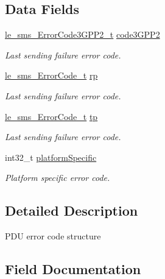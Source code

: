\subsection*{Data Fields}
\begin{DoxyCompactItemize}
\item 
\hyperlink{le__sms__interface_8h_aeb77e45e90a8257c2b386428fa9397df}{le\+\_\+sms\+\_\+\+Error\+Code3\+G\+P\+P2\+\_\+t} \hyperlink{structpa__sms___sending_err_code__t_ae17206b9bab4f574b27748c39e710f5a}{code3\+G\+P\+P2}
\begin{DoxyCompactList}\small\item\em Last sending failure error code. \end{DoxyCompactList}\item 
\hyperlink{le__sms__interface_8h_a67bb87987a78f42c1d7192372463305e}{le\+\_\+sms\+\_\+\+Error\+Code\+\_\+t} \hyperlink{structpa__sms___sending_err_code__t_ad9b7facca93bb5203b5e21f777b5ff15}{rp}
\begin{DoxyCompactList}\small\item\em Last sending failure error code. \end{DoxyCompactList}\item 
\hyperlink{le__sms__interface_8h_a67bb87987a78f42c1d7192372463305e}{le\+\_\+sms\+\_\+\+Error\+Code\+\_\+t} \hyperlink{structpa__sms___sending_err_code__t_ad999ef4e02c8b0284aeedd055db114b8}{tp}
\begin{DoxyCompactList}\small\item\em Last sending failure error code. \end{DoxyCompactList}\item 
int32\+\_\+t \hyperlink{structpa__sms___sending_err_code__t_aa466cba7b72e5626991891534518f0a0}{platform\+Specific}
\begin{DoxyCompactList}\small\item\em Platform specific error code. \end{DoxyCompactList}\end{DoxyCompactItemize}


\subsection{Detailed Description}
P\+DU error code structure 

\subsection{Field Documentation}
